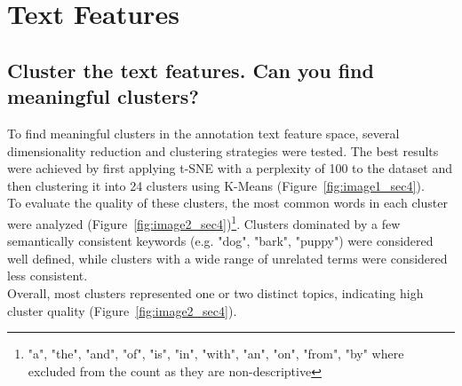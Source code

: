 \section{Text Features}
\label{sec:Text Features}
\subsection{Cluster the text features. Can you find meaningful clusters?}
To find meaningful clusters in the annotation text feature space, several dimensionality reduction and clustering strategies were tested. The best results were achieved by first applying t-SNE with a perplexity of 100 to the dataset and then clustering it into 24 clusters using K-Means (Figure~\ref{fig:image1_sec4}). \\
To evaluate the quality of these clusters, the most common words in each cluster were analyzed (Figure~\ref{fig:image2_sec4})\footnote{"a", "the", "and", "of", "is", "in", "with", "an", "on", "from", "by" where excluded from the count as they are non-descriptive}. Clusters dominated by a few semantically consistent keywords (e.g. "dog", "bark", "puppy") were considered well defined, while clusters with a wide range of unrelated terms were considered less consistent. \\
Overall, most clusters represented one or two distinct topics, indicating high cluster quality (Figure~\ref{fig:image2_sec4}).

